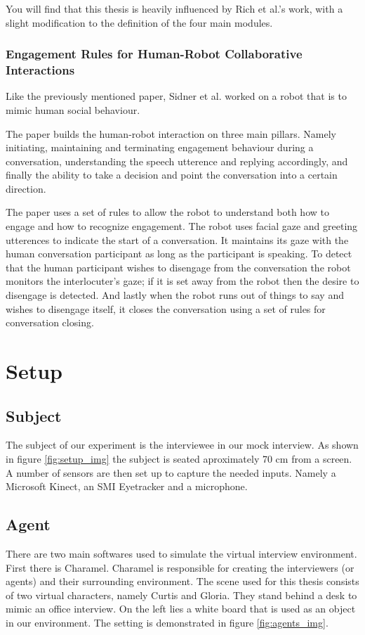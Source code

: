 \documentclass[12pt, a4paper, fleqn]{memoir}%
\begin{document}
You will find that this thesis is heavily influenced by Rich et al.'s work, with a slight modification to the definition of the four main modules.

\subsection{Engagement Rules for Human-Robot Collaborative Interactions}
Like the previously mentioned paper, Sidner et al. \cite{sidner} worked on a robot that is to mimic human social behaviour.

The paper builds the human-robot interaction on three main pillars. Namely initiating, maintaining and terminating engagement behaviour during a conversation, understanding the speech utterence and replying accordingly, and finally the ability to take a decision and point the conversation into a certain direction.

The paper uses a set of rules to allow the robot to understand both how to engage and how to recognize engagement. The robot uses facial gaze and greeting utterences to indicate the start of a conversation. It maintains its gaze with the human conversation participant as long as the participant is speaking. To detect that the human participant wishes to disengage from the conversation the robot monitors the interlocuter's gaze; if it is set away from the robot then the desire to disengage is detected. And lastly when the robot runs out of things to say and wishes to disengage itself, it closes the conversation using a set of rules for conversation closing.

\chapter{Setup}
\label{chap:Section}

\section{Subject}
\label{sec:Subject}
The subject of our experiment is the interviewee in our mock interview. As shown in figure \ref{fig:setup_img} the subject is seated aproximately 70 cm from a screen. A number of sensors are then set up to capture the needed inputs. Namely a Microsoft Kinect, an SMI Eyetracker and a microphone.

\section{Agent}
\label{sec:Agent}
There are two main softwares used to simulate the virtual interview environment. First there is Charamel. Charamel is responsible for creating the interviewers (or agents) and their surrounding environment. The scene used for this thesis consists of two virtual characters, namely Curtis and Gloria. They stand behind a desk to mimic an office interview. On the left lies a white board that is used as an object in our environment. The setting is demonstrated in figure \ref{fig:agents_img}.
\end{document}
